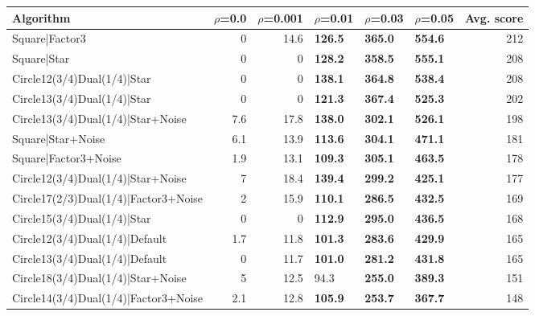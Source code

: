\begin{tabular}{lrrlllr}
\hline
 Algorithm                            &   $\rho$=0.0 &   $\rho$=0.001 & $\rho$=0.01    & $\rho$=0.03    & $\rho$=0.05    &   Avg. score \\
\hline
 Square|Factor3                       &          0   &           14.6 & \textbf{126.5} & \textbf{365.0} & \textbf{554.6} &          212 \\
 Square|Star                          &          0   &            0   & \textbf{128.2} & \textbf{358.5} & \textbf{555.1} &          208 \\
 Circle12(3/4)Dual(1/4)|Star          &          0   &            0   & \textbf{138.1} & \textbf{364.8} & \textbf{538.4} &          208 \\
 Circle13(3/4)Dual(1/4)|Star          &          0   &            0   & \textbf{121.3} & \textbf{367.4} & \textbf{525.3} &          202 \\
 Circle13(3/4)Dual(1/4)|Star+Noise    &          7.6 &           17.8 & \textbf{138.0} & \textbf{302.1} & \textbf{526.1} &          198 \\
 Square|Star+Noise                    &          6.1 &           13.9 & \textbf{113.6} & \textbf{304.1} & \textbf{471.1} &          181 \\
 Square|Factor3+Noise                 &          1.9 &           13.1 & \textbf{109.3} & \textbf{305.1} & \textbf{463.5} &          178 \\
 Circle12(3/4)Dual(1/4)|Star+Noise    &          7   &           18.4 & \textbf{139.4} & \textbf{299.2} & \textbf{425.1} &          177 \\
 Circle17(2/3)Dual(1/4)|Factor3+Noise &          2   &           15.9 & \textbf{110.1} & \textbf{286.5} & \textbf{432.5} &          169 \\
 Circle15(3/4)Dual(1/4)|Star          &          0   &            0   & \textbf{112.9} & \textbf{295.0} & \textbf{436.5} &          168 \\
 Circle12(3/4)Dual(1/4)|Default       &          1.7 &           11.8 & \textbf{101.3} & \textbf{283.6} & \textbf{429.9} &          165 \\
 Circle13(3/4)Dual(1/4)|Default       &          0   &           11.7 & \textbf{101.0} & \textbf{281.2} & \textbf{431.8} &          165 \\
 Circle18(3/4)Dual(1/4)|Star+Noise    &          5   &           12.5 & 94.3           & \textbf{255.0} & \textbf{389.3} &          151 \\
 Circle14(3/4)Dual(1/4)|Factor3+Noise &          2.1 &           12.8 & \textbf{105.9} & \textbf{253.7} & \textbf{367.7} &          148 \\

\end{tabular}
